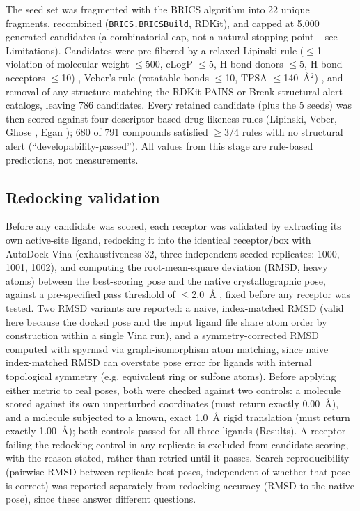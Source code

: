 \documentclass[11pt]{article}
\begin{document}
The seed set was fragmented with the BRICS algorithm \citep{degen2008} into
22 unique fragments, recombined (\texttt{BRICS.BRICSBuild}, RDKit), and
capped at 5,000 generated candidates (a combinatorial cap, not a natural
stopping point -- see Limitations). Candidates were pre-filtered by a
relaxed Lipinski rule ($\leq$1 violation of molecular weight $\leq$500,
cLogP $\leq$5, H-bond donors $\leq$5, H-bond acceptors $\leq$10)
\citep{lipinski1997}, Veber's rule (rotatable bonds $\leq$10, TPSA
$\leq$140~{\AA}$^2$) \citep{veber2002}, and removal of any structure
matching the RDKit PAINS \citep{baell2010} or Brenk structural-alert
catalogs, leaving 786 candidates. Every retained candidate (plus the 5
seeds) was then scored against four descriptor-based drug-likeness rules
(Lipinski, Veber, Ghose \citep{ghose1999}, Egan \citep{egan2000}); 680 of
791 compounds satisfied $\geq$3/4 rules with no structural alert
(``developability-passed''). All values from this stage are rule-based
predictions, not measurements.

\subsection*{Redocking validation}

Before any candidate was scored, each receptor was validated by extracting
its own active-site ligand, redocking it into the identical receptor/box
with AutoDock Vina \citep{trott2010} (exhaustiveness 32, three independent
seeded replicates: 1000, 1001, 1002), and computing the root-mean-square
deviation (RMSD, heavy atoms) between the best-scoring pose and the native
crystallographic pose, against a pre-specified pass threshold of
$\leq$2.0~{\AA} \citep{hartshorn2007}, fixed before any receptor was tested.
Two RMSD variants are reported: a naive, index-matched RMSD (valid here
because the docked pose and the input ligand file share atom order by
construction within a single Vina run), and a symmetry-corrected RMSD
computed with spyrmsd \citep{meli2020} via graph-isomorphism atom matching,
since naive index-matched RMSD can overstate pose error for ligands with
internal topological symmetry (e.g. equivalent ring or sulfone atoms).
Before applying either metric to real poses, both were checked against two
controls: a molecule scored against its own unperturbed coordinates (must
return exactly 0.00~{\AA}), and a molecule subjected to a known, exact
1.0~{\AA} rigid translation (must return exactly 1.00~{\AA}); both controls
passed for all three ligands (Results). A receptor failing the redocking
control in any replicate is excluded from candidate scoring, with the
reason stated, rather than retried until it passes. Search reproducibility
(pairwise RMSD between replicate best poses, independent of whether that
pose is correct) was reported separately from redocking accuracy (RMSD to
the native pose), since these answer different questions.
\end{document}
